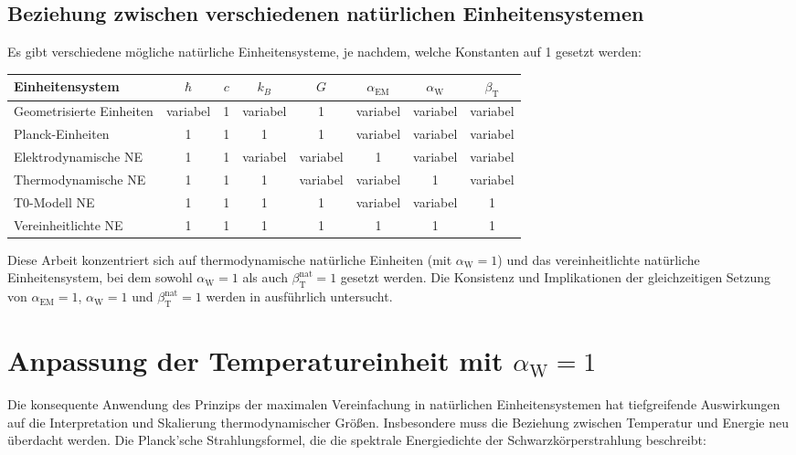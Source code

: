 \documentclass[12pt,a4paper]{article}
\newcommand{\betaT}{\beta_{\text{T}}}
\newcommand{\alphaEM}{\alpha_{\text{EM}}}
\newcommand{\alphaW}{\alpha_{\text{W}}}
\begin{document}
	\subsection{Beziehung zwischen verschiedenen natürlichen Einheitensystemen}
	\label{subsec:unit_systems}
	
	Es gibt verschiedene mögliche natürliche Einheitensysteme, je nachdem, welche Konstanten auf 1 gesetzt werden:
	
	\begin{center}
		\begin{tabular}{|l|c|c|c|c|c|c|c|}
			\hline
			\textbf{Einheitensystem} & \(\hbar\) & \(c\) & \(k_B\) & \(G\) & \(\alphaEM\) & \(\alphaW\) & \(\betaT\) \\
			\hline
			Geometrisierte Einheiten & variabel & 1 & variabel & 1 & variabel & variabel & variabel \\
			Planck-Einheiten & 1 & 1 & 1 & 1 & variabel & variabel & variabel \\
			Elektrodynamische NE & 1 & 1 & variabel & variabel & 1 & variabel & variabel \\
			Thermodynamische NE & 1 & 1 & 1 & variabel & variabel & 1 & variabel \\
			T0-Modell NE & 1 & 1 & 1 & 1 & variabel & variabel & 1 \\
			Vereinheitlichte NE & 1 & 1 & 1 & 1 & 1 & 1 & 1 \\
			\hline
		\end{tabular}
	\end{center}
	
	Diese Arbeit konzentriert sich auf thermodynamische natürliche Einheiten (mit \(\alphaW = 1\)) und das vereinheitlichte natürliche Einheitensystem, bei dem sowohl \(\alphaW = 1\) als auch \(\betaT^{\text{nat}} = 1\) gesetzt werden. Die Konsistenz und Implikationen der gleichzeitigen Setzung von \(\alphaEM = 1\), \(\alphaW = 1\) und \(\betaT^{\text{nat}} = 1\) werden in \cite{pascher_alphabeta_2025} ausführlich untersucht.
	
	\section{Anpassung der Temperatureinheit mit \(\alphaW = 1\)}
	\label{sec:adjustment_alpha_w}
	
	Die konsequente Anwendung des Prinzips der maximalen Vereinfachung in natürlichen Einheitensystemen hat tiefgreifende Auswirkungen auf die Interpretation und Skalierung thermodynamischer Größen. Insbesondere muss die Beziehung zwischen Temperatur und Energie neu überdacht werden. Die Planck'sche Strahlungsformel, die die spektrale Energiedichte der Schwarzkörperstrahlung beschreibt:
	
\end{document}
